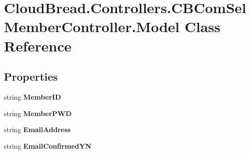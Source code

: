 \hypertarget{class_cloud_bread_1_1_controllers_1_1_c_b_com_sel_member_controller_1_1_model}{}\section{Cloud\+Bread.\+Controllers.\+C\+B\+Com\+Sel\+Member\+Controller.\+Model Class Reference}
\label{class_cloud_bread_1_1_controllers_1_1_c_b_com_sel_member_controller_1_1_model}
\subsection*{Properties}
\begin{DoxyCompactItemize}
\item 
string {\bfseries Member\+ID}\hypertarget{class_cloud_bread_1_1_controllers_1_1_c_b_com_sel_member_controller_1_1_model_a1180dc7aee0e0296a8ca7ec89b018be9}{}\label{class_cloud_bread_1_1_controllers_1_1_c_b_com_sel_member_controller_1_1_model_a1180dc7aee0e0296a8ca7ec89b018be9}

\item 
string {\bfseries Member\+P\+WD}\hypertarget{class_cloud_bread_1_1_controllers_1_1_c_b_com_sel_member_controller_1_1_model_abf73cb850a3560393987adb0909da645}{}\label{class_cloud_bread_1_1_controllers_1_1_c_b_com_sel_member_controller_1_1_model_abf73cb850a3560393987adb0909da645}

\item 
string {\bfseries Email\+Address}\hypertarget{class_cloud_bread_1_1_controllers_1_1_c_b_com_sel_member_controller_1_1_model_ac22593ac90846284d67be452b19ffcc5}{}\label{class_cloud_bread_1_1_controllers_1_1_c_b_com_sel_member_controller_1_1_model_ac22593ac90846284d67be452b19ffcc5}

\item 
string {\bfseries Email\+Confirmed\+YN}\hypertarget{class_cloud_bread_1_1_controllers_1_1_c_b_com_sel_member_controller_1_1_model_acd1efb47c4d71a6cd435d5b27ee4c0b1}{}\label{class_cloud_bread_1_1_controllers_1_1_c_b_com_sel_member_controller_1_1_model_acd1efb47c4d71a6cd435d5b27ee4c0b1}


\end{DoxyCompactItemize}
